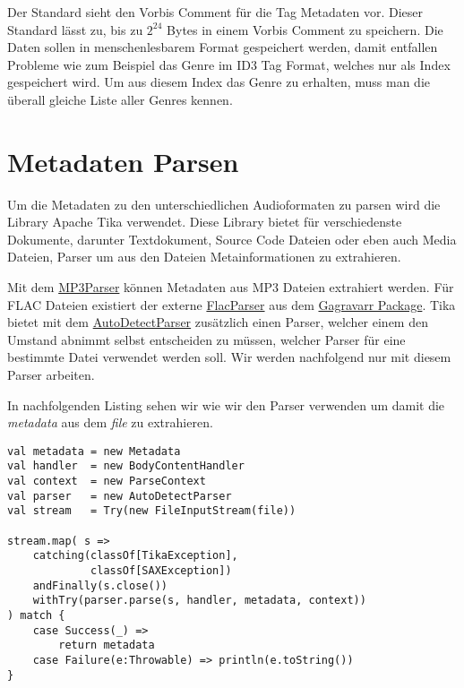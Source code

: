 Der Standard sieht den Vorbis Comment für die Tag Metadaten vor.
Dieser Standard lässt zu, bis zu \(2^{24}\) Bytes in einem
Vorbis Comment zu speichern. Die Daten sollen in
menschenlesbarem Format gespeichert werden, damit entfallen
Probleme wie zum Beispiel das Genre im ID3 Tag Format,
welches nur als Index gespeichert wird. Um aus diesem
Index das Genre zu erhalten, muss man die überall gleiche
Liste aller Genres kennen. \cite{web:vorbiscomment}

\section{Metadaten Parsen}
\label{sec:parse}
Um die Metadaten zu den unterschiedlichen Audioformaten
zu parsen wird die Library Apache Tika \cite{web:tika}
verwendet. Diese Library bietet für verschiedenste
Dokumente, darunter Textdokument, Source Code Dateien
oder eben auch Media Dateien, Parser um aus den Dateien
Metainformationen zu extrahieren.\cite{web:tikaformats}

Mit dem \href{https://tika.apache.org/1.13/api/org/apache/tika/parser/mp3/Mp3Parser}{MP3Parser}
können Metadaten aus MP3 Dateien
extrahiert werden. Für FLAC Dateien existiert der
externe \href{https://github.com/Gagravarr/VorbisJava/blob/master/tika/src/main/java/org/gagravarr/tika/FlacParser.java}{FlacParser}
aus dem \href{https://github.com/Gagravarr/}{Gagravarr Package}.
Tika bietet mit dem
\href{https://tika.apache.org/1.13/api/org/apache/tika/parser/AutoDetectParser.html}{AutoDetectParser}
zusätzlich einen Parser, welcher einem den Umstand abnimmt
selbst entscheiden zu müssen, welcher Parser für eine
bestimmte Datei verwendet werden soll. Wir werden
nachfolgend nur mit diesem Parser arbeiten.

In nachfolgenden Listing sehen wir wie wir den Parser
verwenden um damit die \emph{metadata} aus dem
\emph{file} zu extrahieren.

\begin{lstlisting}[style=myScalastyle]
val metadata = new Metadata
val handler  = new BodyContentHandler
val context  = new ParseContext
val parser   = new AutoDetectParser
val stream   = Try(new FileInputStream(file))

stream.map( s =>
    catching(classOf[TikaException],
             classOf[SAXException])
    andFinally(s.close())
    withTry(parser.parse(s, handler, metadata, context))
) match {
    case Success(_) =>
        return metadata
    case Failure(e:Throwable) => println(e.toString())
}
\end{lstlisting}

